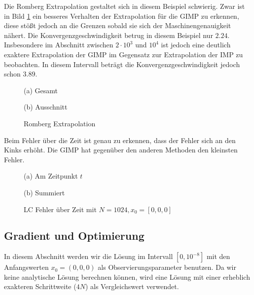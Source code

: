 Die Romberg Extrapolation gestaltet sich in diesem Beispiel schwierig. Zwar ist in Bild \ref{fig:lcRomberg} ein besseres Verhalten der Extrapolation für die GIMP zu erkennen, diese stößt jedoch an die Grenzen sobald sie sich der Maschinengenauigkeit nähert.  Die Konvergenzgeschwindigkeit betrug in diesem Beispiel nur $2.24$. Insbesondere im Abschnitt zwischen $2\cdot 10^{3}$ und $10^4$ ist jedoch eine deutlich exaktere Extrapolation der GIMP im Gegensatz zur Extrapolation der IMP zu beobachten. In diesem Intervall beträgt die Konvergenzgeschwindigkeit jedoch schon $3.89$. 
\begin{figure}[H]
\footnotesize 
\centering
\begin{minipage}[b]{0.49\linewidth}

\caption*{(a) Gesamt}
\end{minipage}
\begin{minipage}[b]{0.49\linewidth}

\caption*{(b) Ausschnitt}
\end{minipage}
\caption{Romberg Extrapolation}
\label{fig:lcRomberg}
\end{figure}



Beim Fehler über die Zeit ist genau zu erkennen, dass der Fehler sich an den Kinks erhöht. Die GIMP hat gegenüber den anderen Methoden den kleinsten Fehler. 
\begin{figure}[H]
\footnotesize 
\centering
\begin{minipage}[b]{0.49\linewidth}

\caption*{(a) Am Zeitpunkt $t$}
\end{minipage}
\begin{minipage}[b]{0.49\linewidth}

\caption*{(b) Summiert}
\end{minipage}
\caption{LC Fehler über Zeit mit $N =1024 ,x_0 = [0,0,0]$}
\end{figure}
\subsection{Gradient und Optimierung}
In diesem Abschnitt werden wir die Lösung im Intervall $[0,10^{-8}]$ mit den Anfangswerten $x_0=(0,0,0)$ als Observierungsparameter benutzen. Da wir keine analytische Lösung berechnen können, wird eine Lösung mit einer erheblich exakteren Schrittweite ($4N$) als Vergleichswert verwendet.

